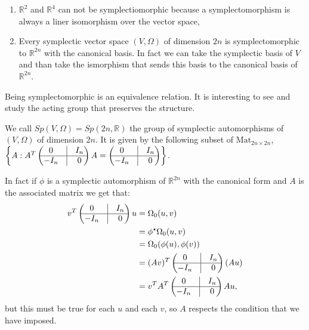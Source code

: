 \documentclass[misc]{subfiles}
\begin{document}
\begin{Exp}\leavevmode
    \begin{enumerate}[label=\ExpLbl]
        \item $\mathbb{R}^2$ and $\mathbb{R}^4$ can not be symplectiomorphic because a symplectomorphism is always a liner isomorphism over the vector space,

        \item Every symplectic vector space $(V,\Omega)$ of dimension $2n$ is symplectomorphic to $\mathbb{R}^{2n}$ with the canonical basis. In fact we can take the symplectic basis of $V$ and than take the ismorphism that sends this basis to the canonical basis of $\mathbb{R}^{2n}$.
    \end{enumerate}
\end{Exp}

\begin{Rmk}
    Being symplectomorphic is an equivalence relation. It is interesting to see and study the acting group that preserves the structure.
\end{Rmk}

\begin{Dfn}
    We call $Sp(V,\Omega)=Sp(2n,\mathbb{R})$ the group of symplectic automorphisms of $(V,\Omega)$ of dimension $2n$. It is given by the following subset of $\text{Mat}_{2n \times 2n}$, $\left\{ A : A^T \begin{pmatrix} 0 &\vline &I_n \\ \hline -I_n &\vline &0\end{pmatrix} A= \begin{pmatrix} 0 &\vline &I_n \\ \hline -I_n &\vline &0\end{pmatrix} \right\} $.

    In fact if $\phi$ is a symplectic automorphism of $\mathbb{R}^{2n}$ with the canonical form and $A$ is the associated matrix we get that:
    \begin{align*}
        v^T \begin{pmatrix} 0 &\vline &I_n \\ \hline -I_n &\vline &0\end{pmatrix} u &=\Omega_0(u,v) \\
                              &=\phi^\star\Omega_0(u,v) \\
                              &=\Omega_0(\phi(u),\phi(v)) \\
                              &=(Av)^T \begin{pmatrix} 0 &\vline &I_n \\ \hline -I_n &\vline &0\end{pmatrix} (Au) \\
                              &=v^T A^T \begin{pmatrix} 0 &\vline &I_n \\ \hline -I_n &\vline &0\end{pmatrix} A u,
    \end{align*}
    but this must be true for each $u$ and each $v$, so $A$ respects the condition that we have imposed.
\end{Dfn}
\end{document}
